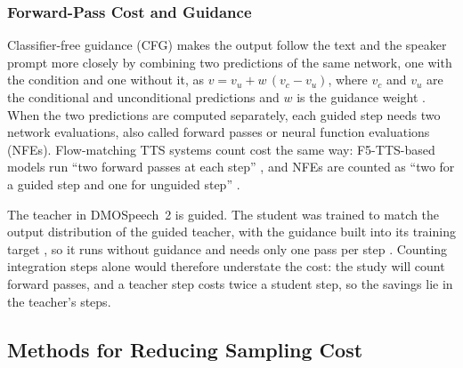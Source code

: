 \subsubsection{Forward-Pass Cost and Guidance}

Classifier-free guidance (CFG) makes the output follow the text and the speaker prompt more closely by combining two predictions of the same network, one with the condition and one without it, as $v = v_u + w\,(v_c - v_u)$, where $v_c$ and $v_u$ are the conditional and unconditional predictions and $w$ is the guidance weight \parencite{ho2022cfg}. When the two predictions are computed separately, each guided step needs two network evaluations, also called forward passes or neural function evaluations (NFEs). Flow-matching TTS systems count cost the same way: F5-TTS-based models run \enquote{two forward passes at each step} \parencite[p.~2]{yang2025shallow}, and NFEs are counted as \enquote{two for a guided step and one for unguided step} \parencite[p.~2]{lee2026guidance}.

The teacher in DMOSpeech~2 is guided. The student was trained to match the output distribution of the guided teacher, with the guidance built into its training target \parencite[p.~20]{li2024dmospeech}, so it runs without guidance and needs only one pass per step \parencite{li2025dmospeech2}. Counting integration steps alone would therefore understate the cost: the study will count forward passes, and a teacher step costs twice a student step, so the savings lie in the teacher's steps.

\subsection{Methods for Reducing Sampling Cost}
\label{sec:rrl-distill}

